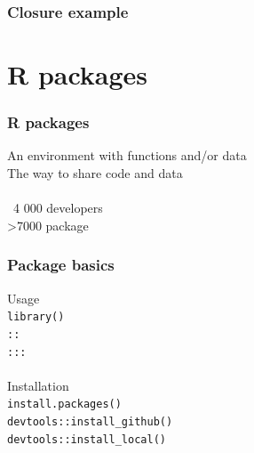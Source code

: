 \documentclass{beamer}
\begin{document}

\begin{frame}
	\frametitle{Closure example}
	\lstClosure
\end{frame}

\section{R packages}

\begin{frame}
	\frametitle{R packages}
	\begin{center}
		An environment with functions and/or data \\
		The way to share code and data \\~\\
		~4 000 developers \\
		\textgreater 7000 package \\
	\end{center}
\end{frame}

\begin{frame}
	\frametitle{Package basics}
	\begin{center}
		Usage \\
		\texttt{library()} \\
		\texttt{::} \\
		\texttt{:::} \\~\\
		Installation \\
		\texttt{install.packages()} \\
		\texttt{devtools::install\_github()} \\
		\texttt{devtools::install\_local()} \\
	\end{center}
\end{frame}
\end{document}

